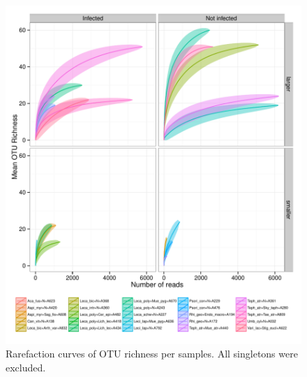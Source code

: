 \documentclass[a4paper, 11]{article}\usepackage[]{graphicx}\usepackage[]{color}
\makeatletter
\def\maxwidth{ %
  \ifdim\Gin@nat@width>\linewidth
    \linewidth
  \else
    \Gin@nat@width
  \fi
}
\newenvironment{knitrout}{}{} %
\makeatother
\begin{document}
\begin{knitrout}
\color{fgcolor}\begin{figure}[H]
\includegraphics[width=\maxwidth]{figure/rarefact2-1} \caption[Rarefaction curves of OTU richness per samples]{Rarefaction curves of OTU richness per samples. All singletons were excluded.}\label{fig:rarefact2}
\end{figure}


\end{knitrout}
\end{document}
